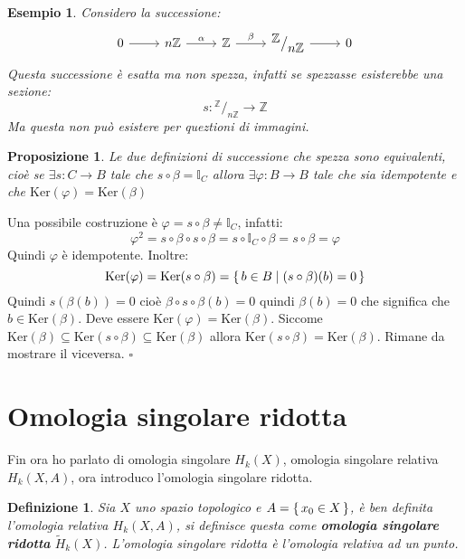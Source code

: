 \documentclass[10pt, twoside=false, x11names]{scrbook}
\newtheorem{proposition}[theorem]{Proposizione}
\newtheorem{definition}[theorem]{Definizione}
\newtheorem{example}[theorem]{Esempio}
\newenvironment{proof}{{\textbf{Dimostrazione}:}}{\hfill $\square$}
\newcommand{\Z}{\mathbb{Z}}
\renewcommand{\ker}[1]{\mathrm{Ker}( #1)}
\renewcommand{\phi}{\varphi}
\newcommand{\Id}[1][]{\mathbb{I}_#1}
\newcommand*\quot[2]{{^{\textstyle #1}\big/_{\textstyle #2}}}
\begin{document}
\begin{example}
  Considero la successione:
  \[
    \begin{tikzcd}
      0 \arrow{r}{} & n \Z \arrow{r}{\alpha} & \Z \arrow{r}{\beta} & \quot{\Z}{n\Z} \arrow{r}{} & 0
    \end{tikzcd}
  \]
  Questa successione è esatta ma non spezza, infatti se spezzasse esisterebbe una sezione:
  \[
    s \colon \quot{\Z}{n\Z} \to \Z
  \]
  Ma questa non può esistere per queztioni di immagini.
\end{example}

\begin{proposition}
  Le due definizioni di successione che spezza sono equivalenti, cioè
  se $ \exists s \colon C \to B $ tale che $ s \circ \beta = \Id{C} $ allora $ \exists \phi \colon B \to B $ tale che sia
  idempotente e che $ \ker{\phi} = \ker{\beta} $
\end{proposition}
\begin{proof}
  Una possibile costruzione è $ \phi = s \circ \beta \not = \Id{C} $, infatti:
  \[
    \phi^2 = s \circ \beta \circ s \circ \beta = s \circ \Id{C} \circ \beta = s \circ \beta = \phi
  \]
  Quindi $ \phi $ è idempotente. Inoltre:
  \[
    \ker{\phi} = \ker{s \circ \beta} = \set{ b \in B | (s \circ \beta)(b) = 0}
  \]
  Quindi $ s(\beta(b)) = 0 $ cioè $  \beta \circ s \circ \beta (b) = 0 $ quindi $ \beta(b) = 0 $ che significa
  che $ b \in \ker{\beta} $. Deve essere $ \ker{\phi} = \ker{\beta} $. Siccome
  $ \ker{\beta} \subseteq \ker{s \circ \beta} \subseteq \ker{\beta} $ allora $ \ker{s \circ \beta} = \ker{\beta} $.
  Rimane da mostrare il viceversa.
\end{proof}

\section{Omologia singolare ridotta}

Fin ora ho parlato di omologia singolare $ H_k(X) $, omologia singolare relativa
$ H_k(X,A) $, ora introduco l'omologia singolare ridotta.

\begin{definition}
  Sia $ X $ uno spazio topologico e $ A = \set{x_0 \in X} $, è ben definita l'omologia
  relativa $ H_k(X, A) $, si definisce questa come \textbf{omologia singolare ridotta}
  $ \tilde{H}_k(X) $.
  L'omologia singolare ridotta è l'omologia relativa ad un punto.
\end{definition}
\end{document}
